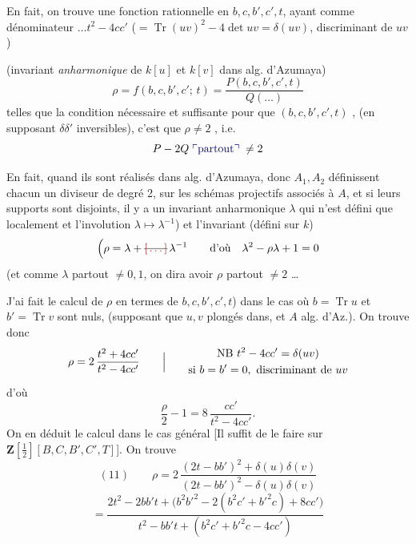 \documentclass[11pt,a4paper]{article}
\begin{document}
En fait, on trouve une fonction rationnelle en $b, c, b', c', t$, ayant comme dénominateur $\ldots t^2 - 4cc'$ ($= \operatorname{Tr}(uv)^2 - 4\det uv = \delta(uv)$, discriminant de $uv$)

(invariant \emph{anharmonique} de $k[u]$ et $k[v]$ dans alg. d'Azumaya) 
\[
\rho = f(b, c, b', c';\, t) = \frac{P(b, c, b', c', t)}{Q(\ldots)}
\]
telles que la condition nécessaire et suffisante pour que  $(b, c, b', c', t)$    ,  (en supposant $\delta\delta'$ inversibles), c'est que $\rho \neq 2$ , i.e.
\[
P - 2Q \;\text{\add{partout}}\; \neq 2
\]

En fait, quand ils sont réalisés dans alg. d'Azumaya,  donc $A_1, A_2$ définissent  chacun un diviseur de degré 2,  sur \struck{\ill{}} les schémas projectifs associés à $A$, et si leurs supports sont disjoints,  il y a un invariant anharmonique $\lambda$  qui n'est défini que localement et  l'involution $\lambda \mapsto \lambda^{-1}$) et l'invariant (défini sur $k$)
\[
\Bigl(\rho = \lambda + \text{\struck{$\ill{}$}}\,\lambda^{-1} \qquad \text{d'où} \quad \lambda^2 - \rho\lambda + 1 = 0
\]
(et comme $\lambda$ partout $\neq 0, 1$, on dira avoir $\rho$ partout $\neq 2$ \ldots

J'ai fait le calcul de $\rho$ en termes de $b, c, b', c', t$) dans le cas où $b = \operatorname{Tr} u$ et $b' = \operatorname{Tr} v$ sont nuls,  (supposant que $u, v$ plongés dans, et $A$ alg. d'Az.). On trouve donc
\[
\rho = 2\,\frac{t^2 + 4cc'}{t^2 - 4cc'}
\qquad\Bigl|\qquad
\begin{gathered}\text{NB } t^2 - 4cc' = \delta(uv)\\ \text{si } b = b' = 0, \text{ discriminant de } uv\end{gathered}
\]
d'où
\[
\frac{\rho}{2} - 1 = 8\,\frac{cc'}{t^2 - 4cc'} .
\]
On en déduit le calcul dans le cas général [Il suffit de le faire sur $\mathbf{Z}[\tfrac12][B, C, B', C', T]$]. On trouve
\[
(11)\qquad \rho = 2\,\frac{(2t - bb')^2 + \delta(u)\delta(v)}{(2t - bb')^2 - \delta(u)\delta(v)}
\]
\[
= \frac{2t^2 - 2bb't + \bigl(b^2b'^2 - 2(b^2c' + b'^2c) + 8cc'\bigr)}{t^2 - bb't + (b^2c' + b'^2c - 4cc')}
\]
\end{document}
